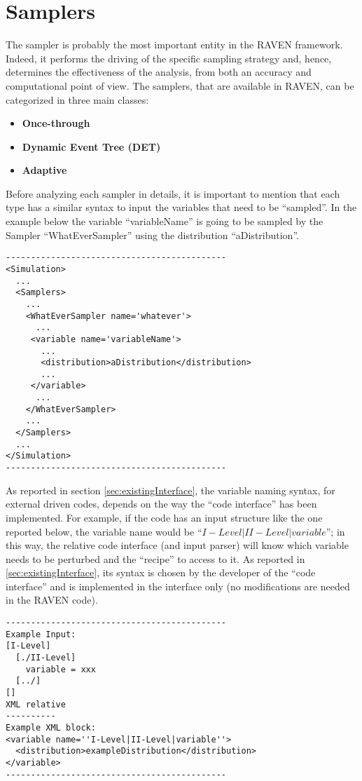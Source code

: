 \section{Samplers  \\ \vspace{2 mm} {\small }}
\label{sec:Samplers}
The sampler is probably the most important entity in the RAVEN framework. Indeed, it performs the driving of the specific sampling strategy and, hence, determines the effectiveness of the analysis, from both an accuracy and computational point of view.  The samplers, that are available in RAVEN, can be categorized in three main classes:
\begin{itemize}
\item \textbf{Once-through}
\item \textbf{Dynamic Event Tree (DET)}
\item \textbf{Adaptive}
\end{itemize}
Before analyzing  each sampler in details, it is important to mention that each type has a similar syntax to input the variables that need to be ``sampled''. In the example below the variable ``variableName'' is going to be sampled by the Sampler ``WhatEverSampler'' using the distribution ``aDistribution''. 
\begin{lstlisting}[style=XML]
--------------------------------------------
<Simulation>
  ...
  <Samplers>
    ...
    <WhatEverSampler name='whatever'>
      ...
     <variable name='variableName'> 
       ...
       <distribution>aDistribution</distribution>
       ...
     </variable>
      ... 
    </WhatEverSampler>
    ...
  </Samplers>
  ...
</Simulation>
--------------------------------------------
\end{lstlisting}
As reported in section \ref{sec:existingInterface}, the variable naming syntax, for external driven codes, depends on the way the ``code interface'' has been implemented. For example, if the code has an input structure like the one reported below, the variable name would be ``$I-Level|II-Level|variable$''; in this way, the relative code interface (and input parser) will know which variable needs to be perturbed and the ``recipe'' to access to it. As reported in \ref{sec:existingInterface}, its syntax is  chosen by the developer of the ``code interface'' and is implemented in the interface only (no modifications are needed in the RAVEN code).

\begin{lstlisting}[style=XML]
--------------------------------------------
Example Input:
[I-Level]
  [./II-Level]
    variable = xxx
  [../]
[]
XML relative 
----------
Example XML block:
<variable name=''I-Level|II-Level|variable''> 
  <distribution>exampleDistribution</distribution>
</variable>
--------------------------------------------
\end{lstlisting}
